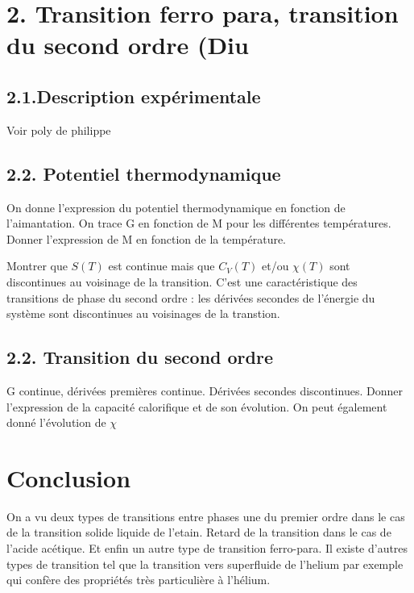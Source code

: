 \documentclass[french, a4paper, 10pt, twocolumn, landscape]{article}
\begin{document}


\section*{2. Transition ferro para, transition du second ordre (Diu}
\subsection*{2.1.Description expérimentale }

Voir poly de philippe

\subsection*{2.2. Potentiel thermodynamique}

On donne l'expression du potentiel thermodynamique en fonction de l'aimantation. On trace G en fonction de M pour les différentes températures. Donner l'expression de M en fonction de la température. 


Montrer que $S(T)$ est continue mais que $C_V(T)$ et/ou $\chi(T)$ sont discontinues au voisinage de la transition. C'est une caractéristique des transitions de phase du second ordre : les dérivées secondes de l'énergie du système sont discontinues au voisinages de la transtion.
\subsection*{2.2. Transition du second ordre}

G continue, dérivées premières continue. Dérivées secondes discontinues. Donner l'expression de la capacité calorifique et de son évolution. On peut également donné l'évolution de $\chi$

\section*{Conclusion}

On a vu deux types de transitions entre phases une du premier ordre dans le cas de la transition solide liquide de l'etain. Retard de la transition dans le cas de l'acide acétique. Et enfin un autre type de transition ferro-para. Il existe d'autres types de transition tel que la transition vers superfluide de l'helium par exemple qui confère des propriétés très particulière à l'hélium.
\end{document}
